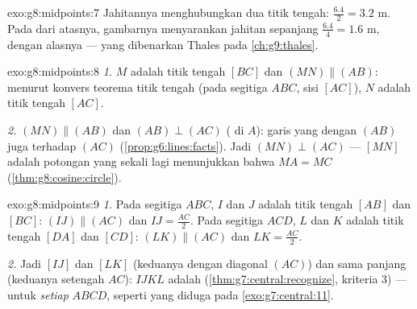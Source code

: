\begin{solution}{exo:g8:midpoints:7}
Jahitannya menghubungkan dua titik tengah: $\frac{6.4}{2} = 3.2$ m.
Pada  dari  atasnya, gambarnya menyarankan
jahitan sepanjang $\frac{6.4}{4} = 1.6$ m,  dengan alasnya ---
yang dibenarkan Thales pada \cref{ch:g9:thales}.
\end{solution}

\begin{solution}{exo:g8:midpoints:8}
\emph{1.} $M$ adalah titik tengah $[BC]$ dan $(MN) \parallel (AB)$:
menurut konvers teorema titik tengah (pada segitiga $ABC$,
sisi $[AC]$), $N$ adalah titik tengah $[AC]$.

\emph{2.} $(MN) \parallel (AB)$ dan $(AB) \perp (AC)$ (
di $A$): garis yang  dengan $(AB)$ juga  terhadap
$(AC)$ (\cref{prop:g6:lines:facts}). Jadi $(MN) \perp (AC)$ ---  $[MN]$ adalah potongan  yang sekali lagi menunjukkan
bahwa $MA = MC$ (\cref{thm:g8:cosine:circle}).
\end{solution}

\begin{solution}{exo:g8:midpoints:9}
\emph{1.} Pada segitiga $ABC$, $I$ dan $J$ adalah titik tengah $[AB]$
dan $[BC]$: $(IJ) \parallel (AC)$ dan $IJ = \frac{AC}{2}$. Pada
segitiga $ACD$, $L$ dan $K$ adalah titik tengah $[DA]$ dan $[CD]$:
$(LK) \parallel (AC)$ dan $LK = \frac{AC}{2}$.

\emph{2.} Jadi $[IJ]$ dan $[LK]$  (keduanya  dengan
diagonal $(AC)$) dan sama panjang (keduanya setengah $AC$): $IJKL$
adalah  (\cref{thm:g7:central:recognize}, kriteria 3) ---
untuk \emph{setiap}  $ABCD$, seperti yang diduga pada
\cref{exo:g7:central:11}.
\end{solution}

